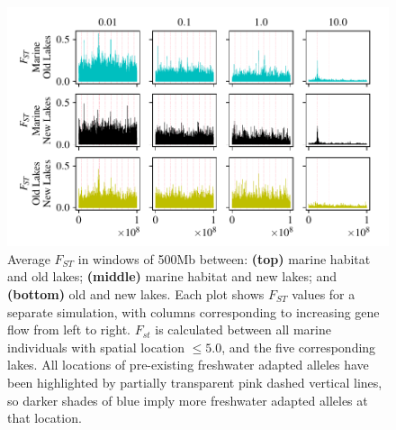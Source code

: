 \documentclass{article}
\begin{document}
\begin{figure}
    \begin{center}
          \includegraphics[width=1.0\linewidth]{Final_Plots/Fst_Genome_faa0_5_500.pdf}
          \caption{
        Average $F_{ST}$ in windows of 500Mb between:
                \textbf{(top)} marine habitat and old lakes;
                \textbf{(middle)} marine habitat and new lakes; and
                \textbf{(bottom)} old and new lakes.
                Each plot shows $F_{ST}$ values for a separate simulation,
                with columns corresponding to increasing gene flow from left to right.
        $F_{st}$ is calculated between all marine individuals with spatial location $\le 5.0$, and the five corresponding lakes.
        All locations of pre-existing freshwater adapted alleles have been highlighted by 
        partially transparent pink dashed vertical lines, so darker shades of blue imply more 
        freshwater adapted alleles at that location.
        }
          \label{fig:fst_5lakes}
    \end{center}
\end{figure}

\newpage

 
\end{document}
